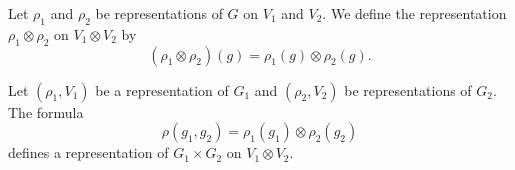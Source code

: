 \begin{definition}
    Let \( \rho_1\) and \( \rho_2\) be representations of \( G\) on \( V_1\) and \( V_2\). We define the representation \( \rho_1\otimes \rho_2\) on \( V_1\otimes V_2\) by
    \begin{equation}
        (\rho_1\otimes \rho_2)(g)=\rho_1(g)\otimes \rho_2(g).
    \end{equation}
\end{definition}

\begin{proposition}
    Let \( (\rho_1,V_1)\) be a representation of \( G_1\) and \( (\rho_2,V_2)\) be representations of \( G_2\). The formula
    \begin{equation}
        \rho(g_1,g_2)=\rho_1(g_1)\otimes \rho_2(g_2)
    \end{equation}
    defines a representation of \( G_1\times G_2\) on \( V_1\otimes V_2\).
\end{proposition}
